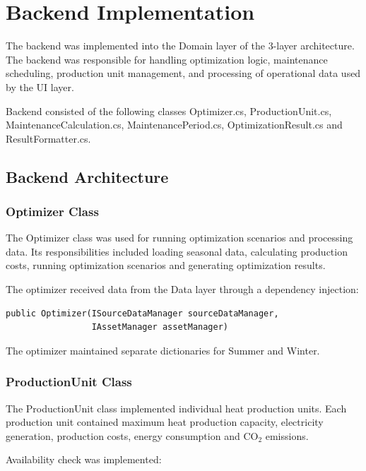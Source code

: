 \section{Backend Implementation}

The backend was implemented into the Domain layer of the 3-layer architecture. The backend was responsible for handling optimization logic, maintenance scheduling, production unit management, and processing of operational data used by the UI layer.

Backend consisted of the following classes Optimizer.cs, ProductionUnit.cs, MaintenanceCalculation.cs, MaintenancePeriod.cs, OptimizationResult.cs and ResultFormatter.cs.

\subsection{Backend Architecture}


\subsubsection{Optimizer Class}

The Optimizer class was used for running optimization scenarios and processing data.
Its responsibilities included loading seasonal data, calculating production costs, running optimization scenarios and generating optimization results.

\noindent \newline The optimizer received data from the Data layer through a dependency injection:

\begin{verbatim}
public Optimizer(ISourceDataManager sourceDataManager,
                 IAssetManager assetManager)
\end{verbatim}
The optimizer maintained separate dictionaries for Summer and Winter.



\subsubsection{ProductionUnit Class}

The ProductionUnit class implemented individual heat production units.
Each production unit contained maximum heat production capacity, electricity generation, production costs, energy consumption and CO$_2$ emissions.

\noindent \newline Availability check was implemented:

